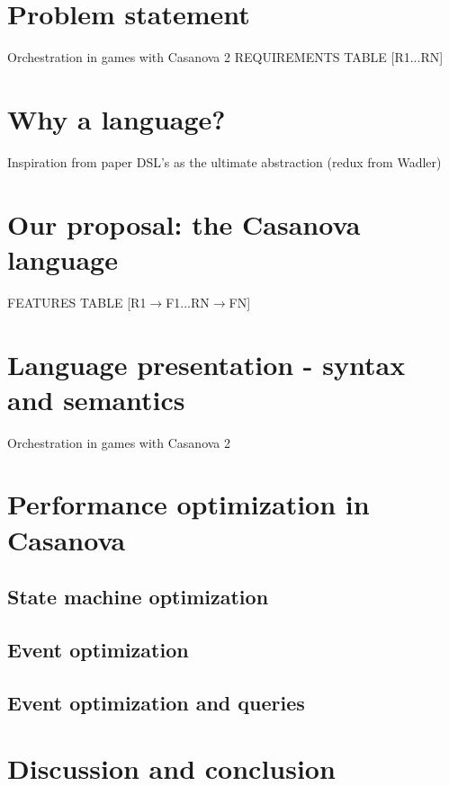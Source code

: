 \documentclass[10pt,a4paper]{article}
\begin{document}
\section{Problem statement}
Orchestration in games with Casanova 2
REQUIREMENTS TABLE [R1...RN]
\section{Why a language?}
Inspiration from paper DSL's as  the ultimate abstraction (redux from Wadler)
\section{Our proposal: the Casanova language}
FEATURES TABLE [R1$\rightarrow$F1...RN$\rightarrow$FN]
\section{Language presentation - syntax and semantics}
Orchestration in games with Casanova 2


\section{Performance optimization in Casanova}
\subsection{State machine optimization}
\subsection{Event optimization}
\subsection{Event optimization and queries}
\section{Discussion and conclusion}

\end{document}
